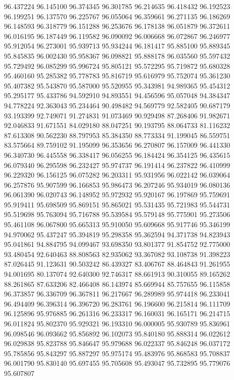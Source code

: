 96.437224
96.145100
96.374345
96.301785
96.214635
96.418432
96.192523
96.199251
96.137570
96.225767
96.055064
96.359661
96.271135
96.186269
96.148593
96.318779
96.151288
96.253676
96.178138
96.051879
96.372611
96.016195
96.187449
96.119582
96.090092
96.006668
96.072867
96.246977
95.912054
96.273001
95.939713
95.934244
96.181417
95.885100
95.889345
95.845835
96.002430
95.958367
96.098821
95.888178
96.035560
95.597432
95.729492
96.085299
95.996724
95.805121
95.572295
95.719872
95.680328
95.460160
95.285382
95.778783
95.816719
95.616979
95.752074
95.361230
95.407382
95.543870
95.587000
95.520955
95.343981
94.989365
95.454312
95.295177
95.433786
94.592910
94.893551
94.456596
95.057048
94.384347
94.778224
92.363043
95.234464
90.498482
94.569779
92.582405
90.687179
93.193399
92.749071
91.274831
91.073469
90.929498
87.268406
91.982671
92.046833
91.671551
84.029180
88.047251
90.193795
88.064733
81.116232
87.613308
90.562230
88.797953
85.384350
88.773334
91.199045
86.559751
83.575664
89.759102
91.195099
96.353656
96.270807
96.157009
96.441330
96.340730
96.445558
96.338417
96.056255
96.184424
96.354125
96.435615
96.079340
96.295598
96.232427
95.974737
96.191414
96.237822
96.410999
96.229320
96.156125
96.075282
96.203311
95.931956
96.022142
96.039064
96.257876
95.907599
96.166853
95.986473
96.207246
95.934019
96.080136
96.061390
96.020743
96.148952
95.972932
95.920167
96.197869
95.759691
95.919411
95.698509
95.869151
95.865021
95.531435
95.721983
95.544731
95.519698
95.763094
95.716788
95.539584
95.579148
95.775901
95.273506
95.461108
96.067800
95.665313
95.910050
95.609668
95.917746
95.346199
94.970062
95.437247
95.394819
95.298358
95.362594
94.371738
94.823943
95.041861
94.884795
94.099467
93.698350
93.801377
91.854752
92.775000
93.480454
92.640463
88.808563
82.935062
93.367082
93.108738
91.398223
87.026445
91.123631
90.503242
86.439327
83.406767
88.464843
91.261955
94.001695
80.137074
92.640300
92.746317
88.661913
90.310055
89.165262
88.261865
87.633206
82.466408
86.143974
85.669944
85.757655
96.115858
96.373857
96.336709
96.367811
96.217667
96.289989
95.974418
96.233041
96.494409
96.396314
96.396720
96.283761
96.196600
96.215814
96.111709
96.125896
95.976885
96.261316
96.233317
96.160031
96.165171
96.214715
96.011824
95.802370
95.929321
96.193310
96.000005
95.930789
95.836961
96.098546
96.093662
95.856892
96.102073
95.840180
95.888314
96.022612
96.029838
95.823788
95.846647
95.979688
96.022337
95.846248
96.037172
95.785856
95.843297
95.887297
95.975174
95.483976
95.868583
95.708837
96.001790
95.830140
95.697455
95.705608
95.493047
95.732895
95.779076
95.607807
